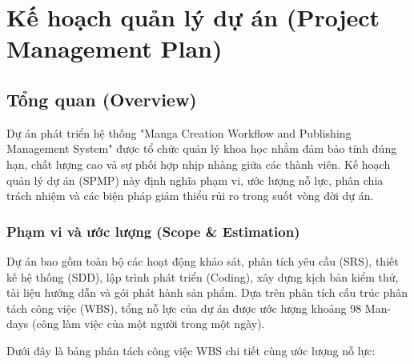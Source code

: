 \chapter{Kế hoạch quản lý dự án (Project Management Plan)}
\label{ch:quan_ly_du_an}

\section{Tổng quan (Overview)}
\label{sec:spmp_overview}

Dự án phát triển hệ thống "Manga Creation Workflow and Publishing Management System" được tổ chức quản lý khoa học nhằm đảm bảo tính đúng hạn, chất lượng cao và sự phối hợp nhịp nhàng giữa các thành viên. Kế hoạch quản lý dự án (SPMP) này định nghĩa phạm vi, ước lượng nỗ lực, phân chia trách nhiệm và các biện pháp giảm thiểu rủi ro trong suốt vòng đời dự án.

\subsection{Phạm vi và ước lượng (Scope \& Estimation)}
\label{subsec:spmp_scope_estimation}

Dự án bao gồm toàn bộ các hoạt động khảo sát, phân tích yêu cầu (SRS), thiết kế hệ thống (SDD), lập trình phát triển (Coding), xây dựng kịch bản kiểm thử, tài liệu hướng dẫn và gói phát hành sản phẩm. Dựa trên phân tích cấu trúc phân tách công việc (WBS), tổng nỗ lực của dự án được ước lượng khoảng 98 Man-days (công làm việc của một người trong một ngày).

Dưới đây là bảng phân tách công việc WBS chi tiết cùng ước lượng nỗ lực:

